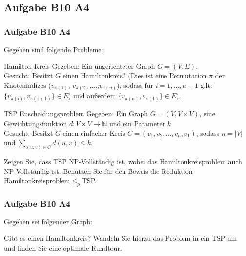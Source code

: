 \subsection{Aufgabe B10 A4}
\begin{frame}
	\frametitle{Aufgabe B10 A4}
 Gegeben sind folgende Probleme: 
	\begin{block}{Hamilton-Kreis}
	Gegeben: Ein ungerichteter Graph $G=(V,E)$.\\
	Gesucht: Besitzt $G$ einen Hamiltonkreis? (Dies ist eine Permutation $\pi$ der Knotenindizes ($v_{\pi(1)}$, $v_{\pi(2)}$,...,$v_{\pi(n)}$), sodass für $i=1,...,n-1$ gilt: $\{v_{\pi(i)},v_{\pi(i+1)}\}\in E$) und 
außerdem $\{v_{\pi(n)},v_{\pi(1)}\} \in E)$.
	\end{block}
\begin{block}{TSP Enscheidungsproblem}
	Gegeben: Ein Graph $G=(V,V \times V)$, eine Gewichtungsfunktion $d: V \times V \rightarrow \mathbb{N}$ und ein Parameter $k$\\
	Gesucht: Besitzt $G$ einen einfacher Kreis $C=(v_1,v_2,...,v_n,v_1)$, sodass $n=|V|$ und $\sum_{(u,v)\in C} d(u,v) \leq k$.\\
	\end{block}
Zeigen Sie, dass TSP NP-Vollständig ist, wobei das Hamiltonkreisproblem auch NP-Vollständig ist. Benutzen Sie für den Beweis die Reduktion Hamiltonkreisproblem$\leq_p$TSP. 
\end{frame}
\begin{frame}
	\frametitle{Aufgabe B10 A4}
Gegeben sei folgender Graph:\newline
\begin{center}
\end{center}
Gibt es einen Hamiltonkreis? Wandeln Sie hierzu das Problem in ein TSP um und finden Sie eine optimale Rundtour.
\end{frame}
